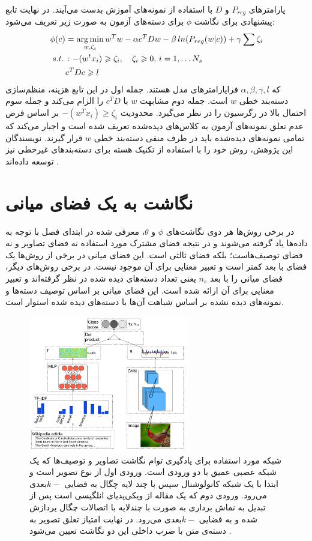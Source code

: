 پارامترهای $P_{reg}$ و $D$ با استفاده از نمونه‌های آموزش بدست می‌آیند.
در نهایت تابع پیشنهادی برای نگاشت $\phi$ برای دسته‌های آزمون به صورت زیر تعریف می‌شود:
\begin{align}
\label{eq:write_a}
\phi(c) &= \operatorname*{arg\,min}_{w,\zeta_i} w^Tw - \alpha c^TDw -\beta \, ln(P_{reg}(w|c)) + \gamma \sum \zeta_i \\
s.t. \, &: -(w^tx_i) \geqslant \zeta_i, \quad \zeta_i \geqslant 0, \, i=1,\ldots N_s  \nonumber \\
& c^TDc \geqslant l \nonumber
\end{align}
که $\alpha, \beta, \gamma, l$ فراپارامترهای مدل هستند. جمله اول در این تابع هزینه، منظم‌سازی دسته‌بند خطی $w$ است. جمله دوم مشابهت $w$ با $c^TD$ را الزام می‌کند و جمله سوم احتمال بالا در رگرسیون را در نظر می‌گیرد. محدودیت $-(w^Tx_i) \geq \zeta_i$ بر اساس فرض عدم تعلق
نمونه‌های آزمون به کلاس‌های دیده‌شده تعریف شده است و اجبار می‌کند که تمامی نمونه‌های دیده‌شده باید در طرف منفی دسته‌بند خطی $w$ قرار گیرند.
نویسندگان این پژوهش، روش خود را با استفاده از تکنیک هسته
برای دسته‌بندهای غیرخطی نیز توسعه داده‌اند \cite{elhoseiny2015}.

\section{نگاشت به یک فضای میانی}
در برخی روش‌ها هر دوی نگاشت‌های $\phi$ و $\theta$، معرفی شده در ابتدای فصل با توجه به داده‌ها یاد گرفته می‌شوند و در نتیجه فضای مشترک مورد استفاده نه فضای تصاویر و نه فضای توصیف‌هاست؛ بلکه فضای ثالثی است. این فضای میانی در برخی از روش‌ها یک فضای با بعد کمتر است و تعبیر معنایی برای آن موجود نیست. در برخی روش‌های دیگر، فضای میانی را با بعد $n_s$ یعنی تعداد دسته‌های دیده شده در نظر گرفته‌اند و تعبیر معنایی برای آن ارائه شده است. این فضای میانی بر اساس توصیف دسته‌ها و نمونه‌های دیده نشده بر اساس شباهت آن‌ها با دسته‌های دیده شده استوار است.

\begin{figure}[h] \label{fig:deep}
\begin{center}
\includegraphics[width=7cm]{images/ba.jpg}
\end{center}
\caption{
 شبکه مورد استفاده برای یادگیری توام نگاشت تصاویر و توصیف‌ها که یک شبکه عصبی عمیق با دو ورودی است. ورودی اول از نوع تصویر است و ابتدا با یک شبکه کانولوشنال سپس با چند لایه چگال به فضایی $k-$بعدی می‌رود. ورودی دوم که یک مقاله از ویکی‌پدیای انلگیسی است پس از تبدیل به نماش برداری به صورت  با چندلایه با اتصالات چگال پردازش شده و به فضایی $k-$بعدی می‌رود. در نهایت امتیاز تعلق تصویر به دسته‌ی متن با ضرب داخلی این دو نگاشت تعیین می‌شود \cite{ba2015}.
}
\end{figure}


